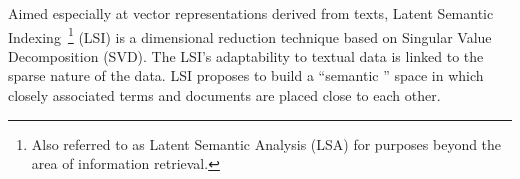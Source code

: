 \documentclass{ieeeaccess}
\begin{document}

Aimed especially at vector representations derived from texts, Latent Semantic Indexing~\footnote {Also referred to as Latent Semantic Analysis (LSA) for purposes beyond the area of information retrieval.} (LSI) is a dimensional reduction technique based on Singular Value Decomposition (SVD). The LSI's adaptability to textual data is linked to the sparse nature of the data. LSI proposes to build a ``semantic '' space in which closely associated terms and documents are placed close to each other.

\end{document}
